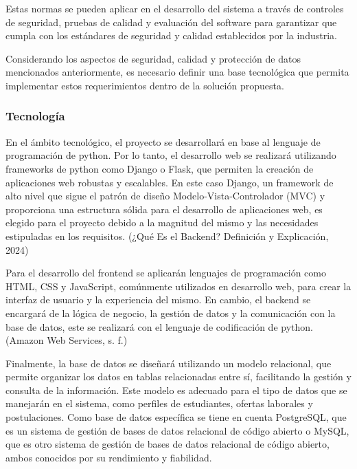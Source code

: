 \documentclass[11pt,a4paper]{Plantilla}
\begin{document}
\vspace{5pt}

Estas normas se pueden aplicar en el desarrollo del sistema a través de controles de seguridad, pruebas de calidad y evaluación del software para garantizar que cumpla con los estándares de seguridad y calidad establecidos por la industria.

\vspace{5pt}

Considerando los aspectos de seguridad, calidad y protección de datos mencionados anteriormente, es necesario definir una base tecnológica que permita implementar estos requerimientos dentro de la solución propuesta.

\subsubsection*{Tecnología}
En el ámbito tecnológico, el proyecto se desarrollará en base al lenguaje de programación de python. Por lo tanto, el desarrollo web se realizará utilizando frameworks de python como Django o Flask, que permiten la creación de aplicaciones web robustas y escalables. En este caso Django, un framework de alto nivel que sigue el patrón de diseño Modelo-Vista-Controlador (MVC) y proporciona una estructura sólida para el desarrollo de aplicaciones web, es elegido para el proyecto debido a la magnitud del mismo y las necesidades estipuladas en los requisitos. (¿Qué Es el Backend? Definición y Explicación, 2024)

\vspace{5pt}

Para el desarrollo del frontend se aplicarán lenguajes de programación como HTML, CSS y JavaScript, comúnmente utilizados en desarrollo web, para crear la interfaz de usuario y la experiencia del mismo. En cambio, el backend se encargará de la lógica de negocio, la gestión de datos y la comunicación con la base de datos, este se realizará con el lenguaje de codificación de python. (Amazon Web Services, s. f.)

\vspace{5pt}

Finalmente, la base de datos se diseñará utilizando un modelo relacional, que permite organizar los datos en tablas relacionadas entre sí, facilitando la gestión y consulta de la información. Este modelo es adecuado para el tipo de datos que se manejarán en el sistema, como perfiles de estudiantes, ofertas laborales y postulaciones. Como base de datos específica se tiene en cuenta PostgreSQL, que es un sistema de gestión de bases de datos relacional de código abierto o MySQL, que es otro sistema de gestión de bases de datos relacional de código abierto, ambos conocidos por su rendimiento y fiabilidad.
\end{document}
